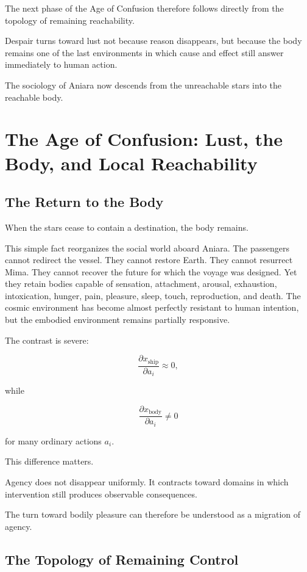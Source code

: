 \documentclass[11pt,oneside]{book}
\theoremstyle{definition}
\theoremstyle{remark}
\begin{document}
The next phase of the Age of Confusion therefore follows directly from the topology of remaining reachability.

Despair turns toward lust not because reason disappears, but because the body remains one of the last environments in which cause and effect still answer immediately to human action.

The sociology of Aniara now descends from the unreachable stars into the reachable body.

\chapter{The Age of Confusion: Lust, the Body, and Local Reachability}

\section{The Return to the Body}

When the stars cease to contain a destination, the body remains.

This simple fact reorganizes the social world aboard Aniara. The passengers cannot redirect the vessel. They cannot restore Earth. They cannot resurrect Mima. They cannot recover the future for which the voyage was designed. Yet they retain bodies capable of sensation, attachment, arousal, exhaustion, intoxication, hunger, pain, pleasure, sleep, touch, reproduction, and death. The cosmic environment has become almost perfectly resistant to human intention, but the embodied environment remains partially responsive.

The contrast is severe:

\[
\frac{\partial x_{\mathrm{ship}}}{\partial a_i}
\approx 0,
\]

while

\[
\frac{\partial x_{\mathrm{body}}}{\partial a_i}
\neq 0
\]

for many ordinary actions \(a_i\).

This difference matters.

Agency does not disappear uniformly. It contracts toward domains in which intervention still produces observable consequences.

The turn toward bodily pleasure can therefore be understood as a migration of agency.

\section{The Topology of Remaining Control}
\end{document}
